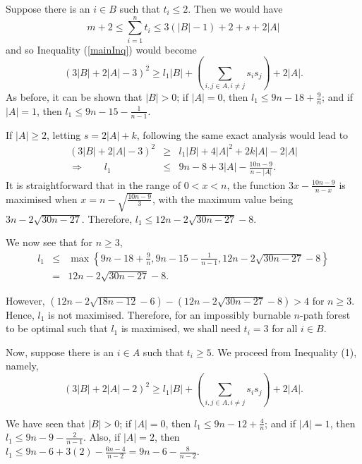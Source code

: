\documentclass[
final
]{dmtcs-episciences}
\theoremstyle{definition}
\theoremstyle{remark}
\begin{document}
Suppose there is an $i\in B$ such that $t_i\le 2$. 
Then we would have
$$m+2 \le \sum_{i=1}^n t_i \le 3(|B|-1)+2 + s + 2|A|$$ and so Inequality (\ref{mainInq}) would become
\begin{displaymath}
\left(3|B| + 2|A| - 3\right)^2 \ge l_1|B| + \left(\sum_{i,j\in A, i\ne j}s_is_j\right) + 2|A|.
\end{displaymath}
As before, it can be shown that $|B|>0$; if $|A| = 0$, then $l_1 \le 9n - 18 + \frac{9}{n}$; and if $|A| = 1$, then $l_1 \le 9n - 15 - \frac{1}{n-1}$.

If $\vert A\vert \geq 2$, letting $s= 2|A|+k$, following the same exact analysis would lead to
\begin{eqnarray*}
(3|B|+2|A|-3)^2 &\ge & l_1|B| + 4|A|^2+2k|A| - 2|A|\\
\Longrightarrow\qquad  l_1 &\le &  9n -8 +3|A| - \frac{10n-9}{n-|A|}.
\end{eqnarray*}
It is straightforward that in the range of $0<x<n$, the function $3x - \frac{10n-9}{n-x}$ is maximised when $x = n - \sqrt{\frac{10n-9}{3}}$, with the maximum value being $3n - 2\sqrt{30n-27}$.  Therefore, $l_1\le 12n - 2\sqrt{30n - 27} - 8$.

We now see that for $n\ge 3$,
\begin{eqnarray*}
l_1 & \le & \max \left\{9n-18+\frac{9}{n}, 9n-15-\frac{1}{n-1},  12n - 2\sqrt{30n - 27} - 8\right\}\\
& = & 12n - 2\sqrt{30n - 27} - 8.
\end{eqnarray*}

However, $(12n- 2\sqrt{18n - 12} - 6)-(  12n -2 \sqrt{30n-27} -8      )>4$  for $n\geq 3$.
Hence, $l_1$ is not maximised. Therefore, for an impossibly burnable $n$-path forest to be optimal such that $l_1$ is maximised, we shall need $t_i=3$ for all $i\in B$.



Now, suppose there is an $i\in A$ such that $t_i\geq 5$. We proceed from Inequality (1), namely,
\begin{displaymath}
\left(3|B| + 2|A| -2\right)^2 \ge l_1|B| + \left(\sum_{i,j\in A, i\ne j}s_is_j\right) + 2|A|.
\end{displaymath}

We have seen that $|B|>0$; if $|A| = 0$, then $l_1 \le 9n - 12 + \frac{4}{n}$; and if $|A| = 1$, then $l_1 \le 9n - 9 - \frac{2}{n-1}$. Also, if $\vert A\vert =2$, then $l_1\le 9n -6+3(2)- \frac{6n-4}{n-2}= 9n-6-\frac{8}{n-2}$.
\end{document}
